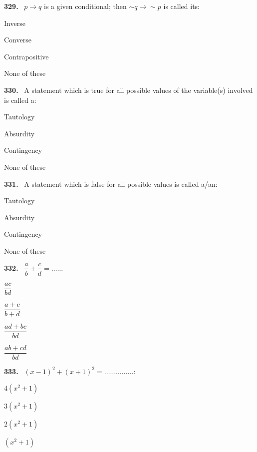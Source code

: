 \documentclass[11pt]{article}
\newenvironment{qenv}[1]{%
  \par\medskip\noindent\textbf{#1.}\ \ignorespaces
}{\par}
\begin{document}
\begin{qenv}{329} $p \to q$ is a given conditional; then $\sim q \to \sim p$ is called its:
\begin{options} \item Inverse \item Converse \item Contrapositive \item None of these \end{options} \end{qenv}

\begin{qenv}{330} A statement which is true for all possible values of the variable(s) involved is called a:
\begin{options} \item Tautology \item Absurdity \item Contingency \item None of these \end{options} \end{qenv}

\begin{qenv}{331} A statement which is false for all possible values is called a/an:
\begin{options} \item Tautology \item Absurdity \item Contingency \item None of these \end{options} \end{qenv}

\begin{qenv}{332} $\dfrac{a}{b}+\dfrac{c}{d} = \ldots\ldots$
\begin{options} \item $\dfrac{ac}{bd}$ \item $\dfrac{a+c}{b+d}$ \item $\dfrac{ad+bc}{bd}$ \item $\dfrac{ab+cd}{bd}$ \end{options} \end{qenv}

\begin{qenv}{333} $(x-1)^2+(x+1)^2 = \ldots\ldots\ldots\ldots\ldots$:
\begin{options} \item $4(x^2+1)$ \item $3(x^2+1)$ \item $2(x^2+1)$ \item $(x^2+1)$ \end{options} \end{qenv}
\end{document}
